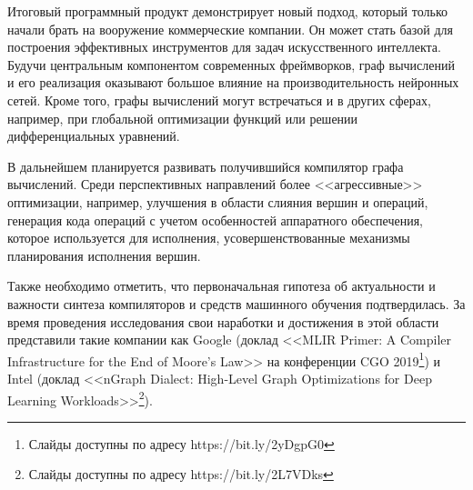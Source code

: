 Итоговый программный продукт демонстрирует
новый подход, который только начали брать на вооружение коммерческие компании. 
Он может стать базой для построения эффективных инструментов для задач 
искусственного интеллекта. Будучи центральным компонентом современных 
фреймворков, граф вычислений и его реализация оказывают большое влияние на 
производительность нейронных сетей. Кроме того, графы вычислений могут 
встречаться и в других сферах, например, при глобальной оптимизации функций или
решении дифференциальных уравнений.

В дальнейшем планируется развивать получившийся компилятор графа вычислений.
Среди перспективных направлений более <<агрессивные>> оптимизации, например,
улучшения в области слияния вершин и операций, генерация кода операций с учетом
особенностей аппаратного обеспечения, которое используется для исполнения,
усовершенствованные механизмы планирования исполнения вершин.

Также необходимо отметить, что первоначальная гипотеза об актуальности и важности
синтеза компиляторов и средств машинного обучения подтвердилась. За время
проведения исследования свои наработки и достижения в этой области представили
такие компании как Google (доклад <<MLIR Primer: A Compiler Infrastructure for 
the End of Moore’s Law>> на конференции CGO 2019\footnote{Слайды доступны по 
адресу https://bit.ly/2yDgpG0}) и Intel (доклад <<nGraph Dialect: High-Level 
Graph Optimizations for Deep Learning Workloads>>\footnote{Слайды доступны по 
адресу https://bit.ly/2L7VDks}).

